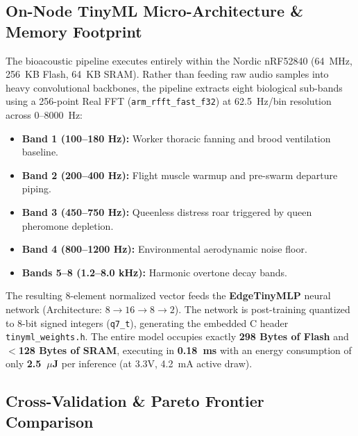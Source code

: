 \documentclass[12pt,a4paper]{article}
\begin{document}
\subsection{On-Node TinyML Micro-Architecture \& Memory Footprint}

The bioacoustic pipeline executes entirely within the Nordic nRF52840 (64~MHz, 256~KB Flash, 64~KB SRAM). Rather than feeding raw audio samples into heavy convolutional backbones, the pipeline extracts eight biological sub-bands using a 256-point Real FFT (\texttt{arm\_rfft\_fast\_f32}) at 62.5~Hz/bin resolution across 0--8000~Hz:
\begin{itemize}[leftmargin=1.5em]
    \item \textbf{Band 1 (100--180 Hz):} Worker thoracic fanning and brood ventilation baseline.
    \item \textbf{Band 2 (200--400 Hz):} Flight muscle warmup and pre-swarm departure piping.
    \item \textbf{Band 3 (450--750 Hz):} Queenless distress roar triggered by queen pheromone depletion.
    \item \textbf{Band 4 (800--1200 Hz):} Environmental aerodynamic noise floor.
    \item \textbf{Bands 5--8 (1.2--8.0 kHz):} Harmonic overtone decay bands.
\end{itemize}

The resulting 8-element normalized vector feeds the \textbf{EdgeTinyMLP} neural network (Architecture: $8 \rightarrow 16 \rightarrow 8 \rightarrow 2$). The network is post-training quantized to 8-bit signed integers (\texttt{q7\_t}), generating the embedded C header \texttt{tinyml\_weights.h}. The entire model occupies exactly \textbf{298 Bytes of Flash} and \textbf{$<$128 Bytes of SRAM}, executing in \textbf{0.18~ms} with an energy consumption of only \textbf{2.5~$\mu$J} per inference (at 3.3V, 4.2~mA active draw).

\subsection{Cross-Validation \& Pareto Frontier Comparison}
\end{document}
